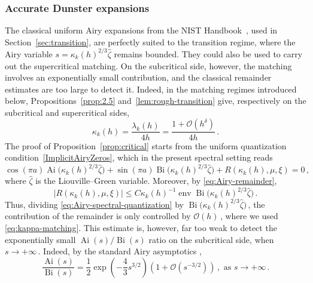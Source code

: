 \documentclass[11pt]{amsart}
\numberwithin{equation}{section}
\theoremstyle{remark}
\newcommand{\Ai}{\operatorname{Ai}}
\newcommand{\Bi}{\operatorname{Bi}}
\begin{document}
\subsubsection{Accurate Dunster expansions}\label{ss:accurate-Dunster}
The classical uniform Airy expansions from the NIST
Handbook~\cite{DLMF}, used in Section~\ref{sec:transition}, are perfectly
suited to the transition regime, where the Airy variable
$s=\kappa_k(h)^{2/3}\widehat\zeta$ remains bounded.
They could also be used to carry out the supercritical matching. On
the subcritical side, however, the matching involves an exponentially
small contribution, and the classical remainder estimates are too
large to detect it. Indeed, in the matching regimes introduced below,
Propositions~\ref{prop:2.5} and~\ref{lem:rough-transition} give,
respectively on the subcritical and supercritical sides,
\begin{equation}\label{eq:kappa-matching}
	\kappa_k(h)=\frac{\lambda_k(h)}{4h}
	=\frac{1+\mathcal O(h^\delta)}{4h}\,.
\end{equation}
The proof of Proposition~\ref{prop:critical} starts from the
uniform quantization condition~\eqref{ImplicitAiryZeros}, which in the
present spectral setting reads
\begin{equation}\label{eq:Airy-spectral-quantization}
	\cos(\pi a)\Ai\bigl(\kappa_k(h)^{2/3}\widehat\zeta\bigr)
	+
	\sin(\pi a)\Bi\bigl(\kappa_k(h)^{2/3}\widehat\zeta\bigr)
	+
	R(\kappa_k(h),\mu,\xi)
	=0\,,
\end{equation}
where $\widehat\zeta$ is the Liouville--Green variable. Moreover, by \eqref{eq:Airy-remainder},
\[
|R(\kappa_k(h),\mu,\xi)|
\leq
C\kappa_k(h)^{-1}
\operatorname{env}\Bi
\bigl(\kappa_k(h)^{2/3}\widehat\zeta\bigr)\,.
\]
Thus, dividing \eqref{eq:Airy-spectral-quantization} by
$\Bi\bigl(\kappa_k(h)^{2/3}\widehat\zeta\bigr)\,$, the contribution
of the remainder is only controlled by $\mathcal O(h)\,$,
where we used \eqref{eq:kappa-matching}.
This estimate is, however, far too weak to detect the exponentially small
$\Ai(s)/\Bi(s)$ ratio on the subcritical side, when $s\to+\infty\,$.
Indeed, by the standard Airy asymptotics
\cite[(9.7.5), (9.7.7)]{DLMF},
\begin{equation}\label{eq:Airy-ratio-plus}
	\frac{\Ai(s)}{\Bi(s)}
	=
	\frac12 \exp\left(-\frac43 s^{3/2}\right)
	\left(1+\mathcal O(s^{-3/2})\right)\,,
	\mbox{ as } s\to+\infty\,.
\end{equation}
\end{document}
